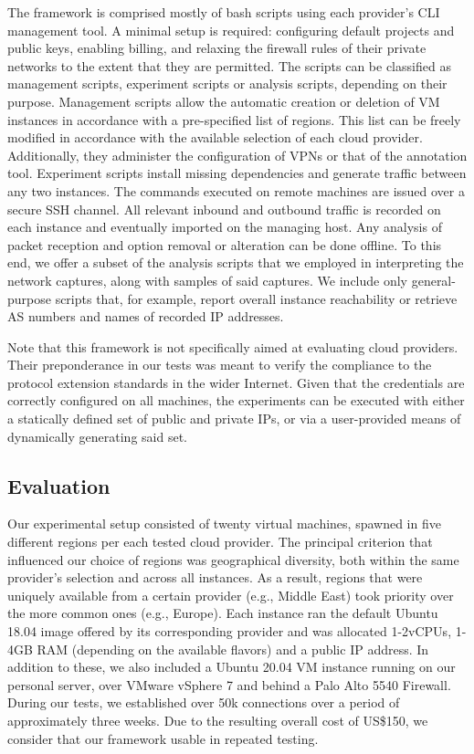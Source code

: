 The framework is comprised mostly of bash scripts using each provider's CLI management tool. A minimal setup is required: configuring default projects and public keys, enabling billing, and relaxing the firewall rules of their private networks to the extent that they are permitted. The scripts can be classified as management scripts, experiment scripts or analysis scripts, depending on their purpose. Management scripts allow the automatic creation or deletion of VM instances in accordance with a pre-specified list of regions. This list can be freely modified in accordance with the available selection of each cloud provider. Additionally, they administer the configuration of VPNs or that of the annotation tool. Experiment scripts install missing dependencies and generate traffic between any two instances. The commands executed on remote machines are issued over a secure SSH channel. All relevant inbound and outbound traffic is recorded on each instance and eventually imported on the managing host. Any analysis of packet reception and option removal or alteration can be done offline. To this end, we offer a subset of the analysis scripts that we employed in interpreting the network captures, along with samples of said captures. We include only general-purpose scripts that, for example, report overall instance reachability or retrieve AS numbers and names of recorded IP addresses.

Note that this framework is not specifically aimed at evaluating cloud providers. Their preponderance in our tests was meant to verify the compliance to the protocol extension standards in the wider Internet. Given that the credentials are correctly configured on all machines, the experiments can be executed with either a statically defined set of public and private IPs, or via a user-provided means of dynamically generating said set.

\subsection{Evaluation}
\label{extend:ops:evaluation}

Our experimental setup consisted of twenty virtual machines, spawned in five different regions per each tested cloud provider. The principal criterion that influenced our choice of regions was geographical diversity, both within the same provider's selection and across all instances. As a result, regions that were uniquely available from a certain provider (e.g., Middle East) took priority over the more common ones (e.g., Europe). Each instance ran the default Ubuntu 18.04 image offered by its corresponding provider and was allocated 1-2vCPUs, 1-4GB RAM (depending on the available flavors) and a public IP address. In addition to these, we also included a Ubuntu 20.04 VM instance running on our personal server, over VMware vSphere 7 and behind a Palo Alto 5540 Firewall. During our tests, we established over 50k connections over a period of approximately three weeks. Due to the resulting overall cost of US\$150, we consider that our framework usable in repeated testing.

